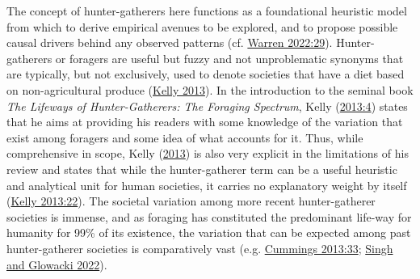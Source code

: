 \documentclass[
  12pt,
  a4paper,
  oneside]{book}
\begin{document}
The concept of hunter-gatherers here functions as a foundational heuristic model from which to derive empirical avenues to be explored, and to propose possible causal drivers behind any observed patterns (cf. \protect\hyperlink{ref-warren2022}{Warren 2022:29}). Hunter-gatherers or foragers are useful but fuzzy and not unproblematic synonyms that are typically, but not exclusively, used to denote societies that have a diet based on non-agricultural produce (\protect\hyperlink{ref-kelly2013}{Kelly 2013}). In the introduction to the seminal book \emph{The Lifeways of Hunter-Gatherers: The Foraging Spectrum}, Kelly (\protect\hyperlink{ref-kelly2013}{2013:4}) states that he aims at providing his readers with \textquotesingle some knowledge of the variation that exist among foragers and some idea of what accounts for it\textquotesingle. Thus, while comprehensive in scope, Kelly (\protect\hyperlink{ref-kelly2013}{2013}) is also very explicit in the limitations of his review and states that while the hunter-gatherer term can be a useful heuristic and analytical unit for human societies, it carries no explanatory weight by itself (\protect\hyperlink{ref-kelly2013}{Kelly 2013:22}). The societal variation among more recent hunter-gatherer societies is immense, and as foraging has constituted the predominant life-way for humanity for 99\% of its existence, the variation that can be expected among past hunter-gatherer societies is comparatively vast (e.g. \protect\hyperlink{ref-cummings2013}{Cummings 2013:33}; \protect\hyperlink{ref-singh2022}{Singh and Glowacki 2022}).
\end{document}
